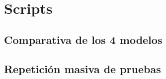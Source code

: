 \section{Scripts} \label{a2_scripts}
\subsection{Comparativa de los 4 modelos}\label{a2_1}


\subsection{Repetición masiva de pruebas}\label{a2_2}




